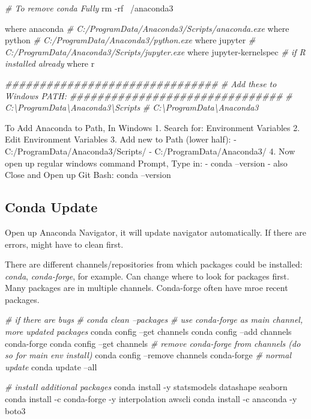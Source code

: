 \documentclass[]{article}
\newenvironment{Shaded}{\begin{snugshade}}{\end{snugshade}}
\newcommand{\CommentTok}[1]{\textcolor[rgb]{0.56,0.35,0.01}{\textit{#1}}}
\newcommand{\ExtensionTok}[1]{#1}
\newcommand{\FunctionTok}[1]{\textcolor[rgb]{0.00,0.00,0.00}{#1}}
\newcommand{\NormalTok}[1]{#1}
\begin{document}
\begin{Shaded}
\begin{Highlighting}[]
\CommentTok{# To remove conda Fully}
\FunctionTok{rm}\NormalTok{ -rf ~/anaconda3}

\ExtensionTok{where}\NormalTok{ anaconda}
\CommentTok{# C:/ProgramData/Anaconda3/Scripts/anaconda.exe}
\ExtensionTok{where}\NormalTok{ python}
\CommentTok{# C:/ProgramData/Anaconda3/python.exe}
\ExtensionTok{where}\NormalTok{ jupyter}
\CommentTok{# C:/ProgramData/Anaconda3/Scripts/jupyter.exe}
\ExtensionTok{where}\NormalTok{ jupyter-kernelspec}
\CommentTok{# if R installed already}
\ExtensionTok{where}\NormalTok{ r}

\CommentTok{###############################}
\CommentTok{# Add these to Windows PATH:}
\CommentTok{###############################}
\CommentTok{# C:\textbackslash{}ProgramData\textbackslash{}Anaconda3\textbackslash{}Scripts}
\CommentTok{# C:\textbackslash{}ProgramData\textbackslash{}Anaconda3}
\end{Highlighting}
\end{Shaded}

To Add Anaconda to Path, In Windows 1. Search for: Environment Variables
2. Edit Environment Variables 3. Add new to Path (lower half): -
C:/ProgramData/Anaconda3/Scripts/ - C:/ProgramData/Anaconda3/ 4. Now
open up regular windows command Prompt, Type in: - conda --version -
also Close and Open up Git Bash: conda --version

\hypertarget{conda-update}{%
\subsection{Conda Update}\label{conda-update}}

Open up Anaconda Navigator, it will update navigator automatically. If
there are errors, might have to clean first.

There are different channels/repositories from which packages could be
installed: \emph{conda}, \emph{conda-forge}, for example. Can change
where to look for packages first. Many packages are in multiple
channels. Conda-forge often have mroe recent packages.

\begin{Shaded}
\begin{Highlighting}[]
\CommentTok{# if there are bugs}
\CommentTok{# conda clean --packages}
\CommentTok{# use conda-forge as main channel, more updated packages}
\ExtensionTok{conda}\NormalTok{ config --get channels}
\ExtensionTok{conda}\NormalTok{ config --add channels conda-forge}
\ExtensionTok{conda}\NormalTok{ config --get channels}
\CommentTok{# remove conda-forge from channels (do so for main env install)}
\ExtensionTok{conda}\NormalTok{ config --remove channels conda-forge}
\CommentTok{# normal update}
\ExtensionTok{conda}\NormalTok{ update --all}

\CommentTok{# install additional packages}
\ExtensionTok{conda}\NormalTok{ install -y statsmodels datashape seaborn}
\ExtensionTok{conda}\NormalTok{ install -c conda-forge -y interpolation awscli}
\ExtensionTok{conda}\NormalTok{ install -c anaconda -y boto3}
\end{Highlighting}
\end{Shaded}
\end{document}
